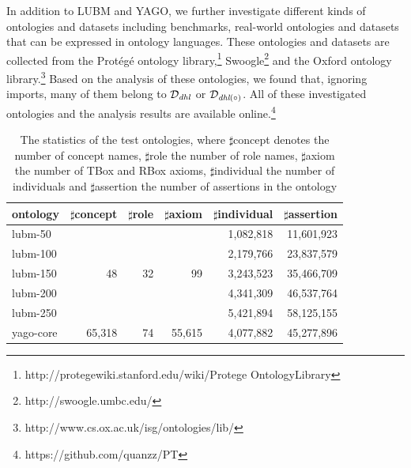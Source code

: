 In addition to LUBM and YAGO, we further investigate different kinds of ontologies and datasets
including benchmarks, real-world ontologies and datasets that can be
expressed in ontology languages.
These ontologies and datasets are collected from the Prot\'{e}g\'{e}
ontology
library,\footnote{http://protegewiki.stanford.edu/wiki/Protege\textunderscore
  Ontology\textunderscore Library}
Swoogle\footnote{http://swoogle.umbc.edu/} and the Oxford ontology library.\footnote{http://www.cs.ox.ac.uk/isg/ontologies/lib/}
Based on the analysis of these ontologies, we found that, ignoring imports, many of them
belong to $\mathcal{D}_{\textit{\text{dhl}}}$ or $\mathcal{D}_{\textit{\text{dhl}}(\circ)}$.
All of these investigated ontologies and the analysis results are available online.\footnote{https://github.com/quanzz/PT}

\begin{table}
\centering
\caption{The statistics of the test ontologies, where $\sharp$concept
  denotes the number of concept names, $\sharp$role the number of role
  names, $\sharp$axiom the number of TBox and RBox axioms,
  $\sharp$individual  the number of individuals and $\sharp$assertion
  the number of assertions in the ontology}
\begin{tabular}{|l|r|r|r|r|r|}
\hline
ontology&$\sharp$concept&$\sharp$role&$\sharp$axiom&$\sharp$individual&$\sharp$assertion\\
\hline
lubm-50&\multirow{5}{*}{48}&\multirow{5}{*}{32}&\multirow{5}{*}{99}&1,082,818&11,601,923\\
lubm-100&&&&2,179,766&23,837,579\\
lubm-150&&&&3,243,523&35,466,709\\
lubm-200&&&&4,341,309&46,537,764\\
lubm-250&&&&5,421,894&58,125,155\\
\hline
yago-core&65,318&74&55,615&4,077,882&45,277,896\\
\hline
\end{tabular}
\label{tab:onto}
\end{table}

